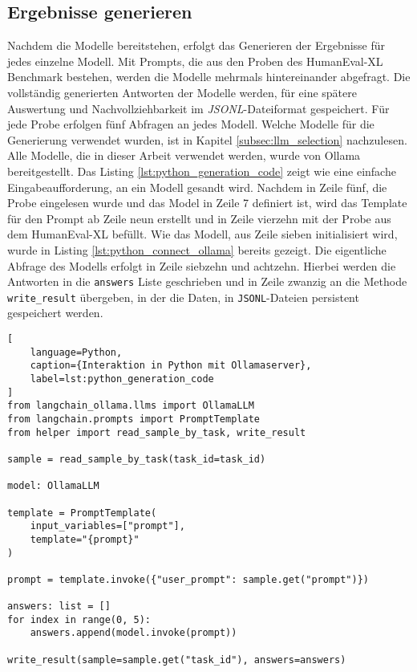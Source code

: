 
\subsection{Ergebnisse generieren}
Nachdem die Modelle bereitstehen, erfolgt das Generieren der Ergebnisse für jedes einzelne Modell. Mit Prompts, die aus den Proben des HumanEval-XL Benchmark bestehen, werden die Modelle mehrmals hintereinander abgefragt. Die vollständig generierten Antworten der Modelle werden, für eine spätere Auswertung und Nachvollziehbarkeit im \textit{JSONL}-Dateiformat gespeichert. Für jede Probe erfolgen fünf Abfragen an jedes Modell. Welche Modelle für die Generierung verwendet wurden, ist in Kapitel \ref{subsec:llm_selection} nachzulesen. Alle Modelle, die in dieser Arbeit verwendet werden, wurde von Ollama bereitgestellt. Das Listing \ref{lst:python_generation_code} zeigt wie eine einfache Eingabeaufforderung, an ein Modell gesandt wird. Nachdem in Zeile fünf, die Probe eingelesen wurde und das Model in Zeile 7 definiert ist, wird das Template für den Prompt ab Zeile neun erstellt und in Zeile vierzehn mit der Probe aus dem HumanEval-XL befüllt. Wie das Modell, aus Zeile sieben initialisiert wird, wurde in Listing \ref{lst:python_connect_ollama} bereits gezeigt. Die eigentliche Abfrage des Modells erfolgt in Zeile siebzehn und achtzehn. Hierbei werden die Antworten in die \texttt{answers} Liste geschrieben und in Zeile zwanzig an die Methode \texttt{write\_result} übergeben, in der die Daten, in \texttt{JSONL}-Dateien persistent gespeichert werden.\vspace{0.2cm}

\begin{lstlisting}[
	language=Python,
	caption={Interaktion in Python mit Ollamaserver},
	label=lst:python_generation_code
]
from langchain_ollama.llms import OllamaLLM
from langchain.prompts import PromptTemplate
from helper import read_sample_by_task, write_result

sample = read_sample_by_task(task_id=task_id)

model: OllamaLLM

template = PromptTemplate(
    input_variables=["prompt"],
    template="{prompt}"
)

prompt = template.invoke({"user_prompt": sample.get("prompt")})

answers: list = []
for index in range(0, 5):
    answers.append(model.invoke(prompt))

write_result(sample=sample.get("task_id"), answers=answers)
\end{lstlisting}

